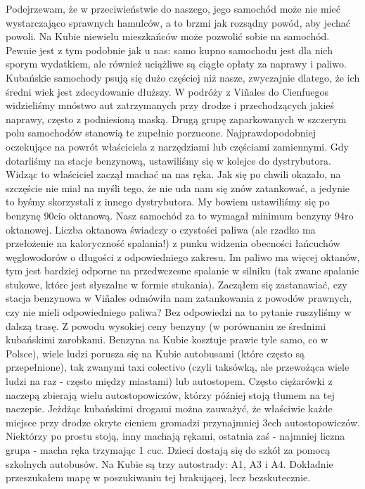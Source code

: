 Podejrzewam, że w przeciwieństwie do naszego, jego samochód może nie mieć wystarczająco sprawnych hamulców, a to brzmi jak rozsądny powód, aby jechać powoli.
Na Kubie niewielu mieszkańców może pozwolić sobie na samochód.
Pewnie jest z tym podobnie jak u nas: samo kupno samochodu jest dla nich sporym wydatkiem, ale również uciążliwe są ciągłe opłaty za naprawy i paliwo.
Kubańskie samochody psują się dużo częściej niż nasze, zwyczajnie dlatego, że ich średni wiek jest zdecydowanie dłuższy.
W podróży z Viñales do Cienfuegos widzieliśmy mnóstwo aut zatrzymanych przy drodze i przechodzących jakieś naprawy, często z podniesioną maską.
Drugą grupę zaparkowanych w szczerym polu samochodów stanowią te zupełnie porzucone.
Najprawdopodobniej oczekujące na powrót właściciela z narzędziami lub częściami zamiennymi.
Gdy dotarliśmy na stacje benzynową, ustawiliśmy się w kolejce do dystrybutora.
Widząc to właściciel zaczął machać na nas ręka.
Jak się po chwili okazało, na szczęście nie miał na myśli tego, że nie uda nam się znów zatankować, a jedynie to byśmy skorzystali z innego dystrybutora.
My bowiem ustawiliśmy się po benzynę 90cio oktanową.
Nasz samochód za to wymagał minimum benzyny 94ro oktanowej.
Liczba oktanowa świadczy o czystości paliwa (ale rzadko ma przełożenie na kaloryczność spalania!) z punku widzenia obecności łańcuchów węglowodorów o długości z odpowiedniego zakresu.
Im paliwo ma więcej oktanów, tym jest bardziej odporne na przedwczesne spalanie w silniku (tak zwane spalanie stukowe, które jest słyszalne w formie stukania).
Zacząłem się zastanawiać, czy stacja benzynowa w Viñales odmówiła nam zatankowania z powodów prawnych, czy nie mieli odpowiedniego paliwa?
Bez odpowiedzi na to pytanie ruszyliśmy w dalszą trasę.
Z powodu wysokiej ceny benzyny (w porównaniu ze średnimi kubańskimi zarobkami.
Benzyna na Kubie kosztuje prawie tyle samo, co w Polsce), wiele ludzi porusza się na Kubie autobusami (które często są przepełnione), tak zwanymi taxi colectivo (czyli taksówką, ale przewożąca wiele ludzi na raz - często między miastami) lub autostopem.
Często ciężarówki z naczepą zbierają wielu autostopowiczów, którzy później stoją tłumem na tej naczepie.
Jeżdżąc kubańskimi drogami można zauważyć, że właściwie każde miejsce przy drodze okryte cieniem gromadzi przynajmniej 3ech autostopowiczów.
Niektórzy po prostu stoją, inny machają rękami, ostatnia zaś - najmniej liczna grupa - macha ręka trzymając 1 cuc.
Dzieci dostają się do szkół za pomocą szkolnych autobusów.
Na Kubie są trzy autostrady: A1, A3 i A4.
Dokładnie przeszukałem mapę w poszukiwaniu tej brakującej, lecz bezskutecznie.
